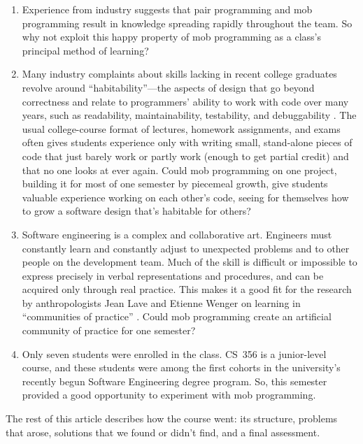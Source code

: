 \documentclass{article}
\begin{document}
\begin{enumerate}
  \item Experience from industry suggests that pair programming and mob
  programming result in knowledge spreading rapidly throughout the team.
  So why not exploit this happy property of mob programming as a class's
  principal method of learning?

  \item Many industry complaints about skills lacking in recent college
  graduates revolve around ``habitability''---the aspects of design that
  go beyond correctness and relate to programmers' ability to work with
  code over many years, such as readability, maintainability, testability,
  and debuggability \cite{Gabriel1996}. The usual college-course format
  of lectures, homework assignments, and exams often gives students
  experience only with writing small, stand-alone pieces of code that just
  barely work or partly work (enough to get partial credit) and that no one
  looks at ever again. Could mob programming on one project, building it for
  most of one semester by piecemeal growth, give students valuable experience
  working on each other's code, seeing for themselves how to grow a 
  software design that's habitable for others?

  \item Software engineering is a complex and collaborative art.
  Engineers must constantly learn and constantly adjust to unexpected problems
  and to other people on the development team. Much of the skill is difficult
  or impossible to express precisely in verbal representations and procedures,
  and can be acquired only through real practice. This makes it a good fit for
  the research by anthropologists Jean Lave and Etienne Wenger on learning in
  ``communities of practice'' \cite{wenger2015introduction}. Could mob
  programming create an artificial community of practice for one semester?

  \item Only seven students were enrolled in the class. CS~356 is a
  junior-level course, and these students were among the first cohorts in the
  university's recently begun Software Engineering degree program. So,
  this semester provided a good opportunity to experiment with mob
  programming.
\end{enumerate}

The rest of this article describes how the course went: its structure,
problems that arose, solutions that we found or didn't find, and a final
assessment.
\end{document}
